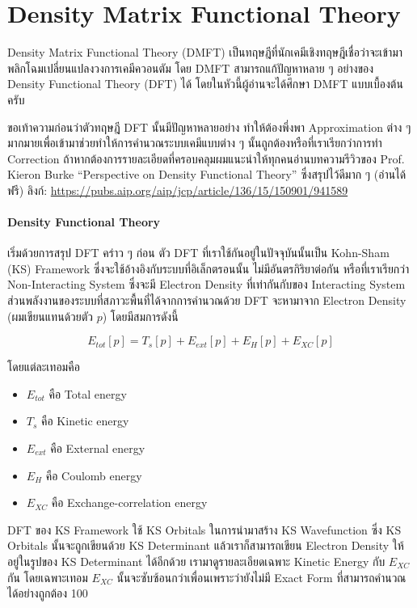 \section{Density Matrix Functional Theory}

Density Matrix Functional Theory (DMFT) เป็นทฤษฎีที่นักเคมีเชิงทฤษฎีเชื่อว่าจะเข้ามาพลิกโฉมเปลี่ยนแปลงวงการเคมีควอนตัม
โดย DMFT สามารถแก้ปัญหาหลาย ๆ อย่างของ Density Functional Theory (DFT) ได้ โดยในหัวนี้ผู้อ่านจะได้ศึกษา DMFT แบบเบื้องต้นครับ

ขอเท้าความก่อนว่าตัวทฤษฎี DFT นั้นมีปัญหาหลายอย่าง ทำให้ต้องพึ่งพา Approximation ต่าง ๆ มากมายเพื่อเข้ามาช่วยทำให้การคำนวณระบบเคมีแบบต่าง ๆ
นั้นถูกต้องหรือที่เราเรียกว่าการทำ Correction ถ้าหากต้องการรายละเอียดที่ครอบคลุมผมแนะนำให้ทุกคนอ่านบทความรีวิวของ Prof. Kieron Burke
\enquote{Perspective on Density Functional Theory} ซึ่งสรุปไว้ดีมาก ๆ (อ่านได้ฟรี)
ลิงก์: \url{https://pubs.aip.org/aip/jcp/article/136/15/150901/941589}

\paragraph{Density Functional Theory}

เริ่มด้วยการสรุป DFT คร่าว ๆ ก่อน ตัว DFT ที่เราใช้กันอยู่ในปัจจุบันนั้นเป็น Kohn-Sham (KS) Framework ซึ่งจะใช้อ้างอิงกับระบบที่อิเล็กตรอนนั้น%
ไม่มีอันตรกิริยาต่อกัน หรือที่เราเรียกว่า Non-Interacting System ซึ่งจะมี Electron Density ที่เท่ากันกับของ Interacting System
ส่วนพลังงานของระบบที่สภาวะพื้นที่ได้จากการคำนวณด้วย DFT จะหามาจาก Electron Density (ผมเขียนแทนด้วยตัว $p$) โดยมีสมการดังนี้

\begin{equation}
  E_{tot}[p] = T_{s}[p] + E_{ext}[p] + E_{H}[p] + E_{XC}[p]
\end{equation}

\noindent โดยแต่ละเทอมคือ
\begin{itemize}
  \item $E_{tot}$ คือ Total energy
  \item $T_{s}$ คือ Kinetic energy
  \item $E_{ext}$ คือ External energy
  \item $E_{H}$ คือ Coulomb energy
  \item $E_{XC}$ คือ Exchange-correlation energy
\end{itemize}

DFT ของ KS Framework ใช้ KS Orbitals ในการนำมาสร้าง KS Wavefunction ซึ่ง KS Orbitals นั้นจะถูกเขียนด้วย KS Determinant
แล้วเราก็สามารถเขียน Electron Density ให้อยู่ในรูปของ KS Determinant ได้อีกด้วย เรามาดูรายละเอียดเฉพาะ Kinetic Energy กับ
$E_{XC}$ กัน โดยเฉพาะเทอม $E_{XC}$ นั้นจะซับซ้อนกว่าเพื่อนเพราะว่ายังไม่มี Exact Form ที่สามารถคำนวณได้อย่างถูกต้อง 100%

